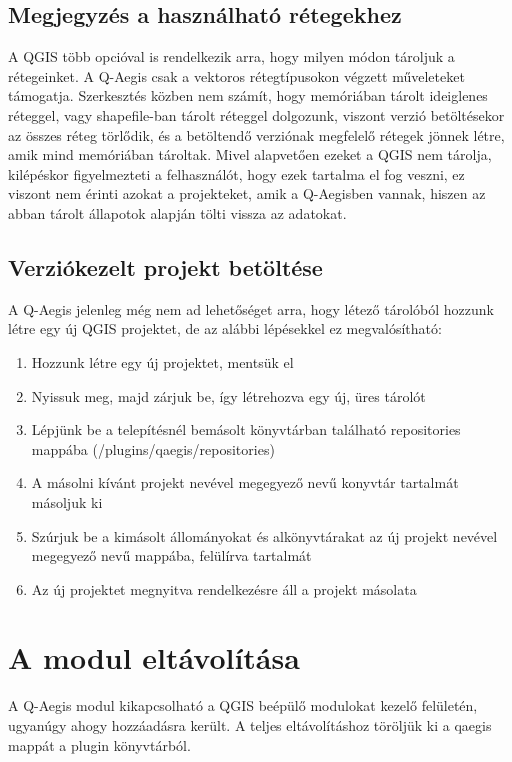\subsection{Megjegyzés a használható rétegekhez}
A QGIS több opcióval is rendelkezik arra, hogy milyen módon tároljuk a rétegeinket. A Q-Aegis csak a vektoros rétegtípusokon végzett műveleteket támogatja. Szerkesztés közben nem számít, hogy memóriában tárolt ideiglenes réteggel, vagy shapefile-ban tárolt réteggel dolgozunk, viszont verzió betöltésekor az összes réteg törlődik, és a betöltendő verziónak megfelelő rétegek jönnek létre, amik mind memóriában tároltak. Mivel alapvetően ezeket a QGIS nem tárolja, kilépéskor figyelmezteti a felhasználót, hogy ezek tartalma el fog veszni, ez viszont nem érinti azokat a projekteket, amik a Q-Aegisben vannak, hiszen az abban tárolt állapotok alapján tölti vissza az adatokat.

\subsection{Verziókezelt projekt betöltése}
A Q-Aegis jelenleg még nem ad lehetőséget arra, hogy létező tárolóból hozzunk létre egy új QGIS projektet, de az alábbi lépésekkel ez megvalósítható:
\begin{enumerate}
	\item Hozzunk létre egy új projektet, mentsük el
	\item Nyissuk meg, majd zárjuk be, így létrehozva egy új, üres tárolót
	\item Lépjünk be a telepítésnél bemásolt könyvtárban található repositories mappába (/plugins/qaegis/repositories)
	\item A másolni kívánt projekt nevével megegyező nevű konyvtár tartalmát másoljuk ki
	\item Szúrjuk be a kimásolt állományokat és alkönyvtárakat az új projekt nevével megegyező nevű mappába, felülírva tartalmát
	\item Az új projektet megnyitva rendelkezésre áll a projekt másolata
\end{enumerate}
	
\section{A modul eltávolítása}
A Q-Aegis modul kikapcsolható a QGIS beépülő modulokat kezelő felületén, ugyanúgy ahogy hozzáadásra került. A teljes eltávolításhoz töröljük ki a qaegis mappát a plugin könyvtárból.
	
